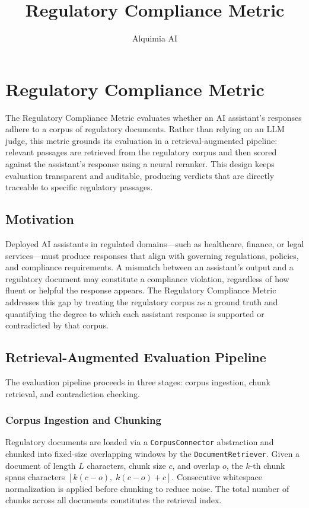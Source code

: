 \documentclass[11pt]{article}
\title{Regulatory Compliance Metric}
\author{Alquimia AI}
\date{}
\begin{document}
\maketitle

\section{Regulatory Compliance Metric}

The Regulatory Compliance Metric evaluates whether an AI assistant's responses adhere to a corpus of regulatory documents. Rather than relying on an LLM judge, this metric grounds its evaluation in a retrieval-augmented pipeline: relevant passages are retrieved from the regulatory corpus and then scored against the assistant's response using a neural reranker. This design keeps evaluation transparent and auditable, producing verdicts that are directly traceable to specific regulatory passages.

\subsection{Motivation}

Deployed AI assistants in regulated domains---such as healthcare, finance, or legal services---must produce responses that align with governing regulations, policies, and compliance requirements. A mismatch between an assistant's output and a regulatory document may constitute a compliance violation, regardless of how fluent or helpful the response appears. The Regulatory Compliance Metric addresses this gap by treating the regulatory corpus as a ground truth and quantifying the degree to which each assistant response is supported or contradicted by that corpus.

\subsection{Retrieval-Augmented Evaluation Pipeline}

The evaluation pipeline proceeds in three stages: corpus ingestion, chunk retrieval, and contradiction checking.

\subsubsection{Corpus Ingestion and Chunking}

Regulatory documents are loaded via a \texttt{CorpusConnector} abstraction and chunked into fixed-size overlapping windows by the \texttt{DocumentRetriever}. Given a document of length $L$ characters, chunk size $c$, and overlap $o$, the $k$-th chunk spans characters $[k(c - o),\; k(c - o) + c]$. Consecutive whitespace normalization is applied before chunking to reduce noise. The total number of chunks across all documents constitutes the retrieval index.
\end{document}
